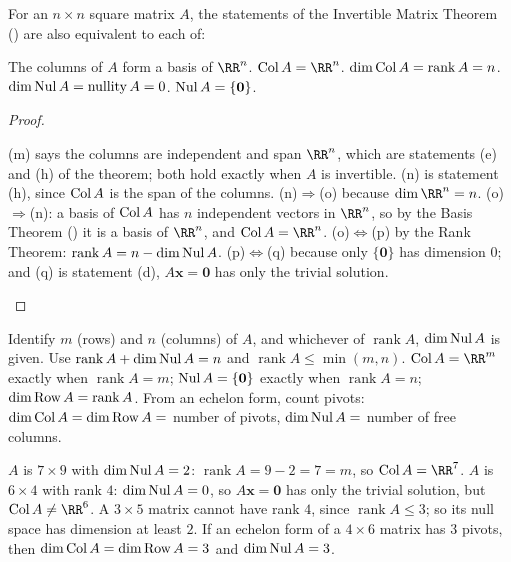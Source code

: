 \documentclass[10pt]{scrartcl}
\newcommand{\vv}[1]{\mathbf{#1}}
\begin{document}
\begin{theorem*}
  For an $n\times n$ square matrix $A$, the statements of the Invertible Matrix Theorem () are also equivalent to each of:
  \begin{enumerate}[(a),start=13]
    \ii The columns of $A$ form a basis of $\RR^n$.
    \ii $\Col A = \RR^n$.
    \ii $\dim\operatorname{Col} A = \operatorname{rank}A = n$.
    \ii $\dim\operatorname{Nul} A = \operatorname{nullity} A = 0$.
    \ii $\Nul A = \{\vv 0\}$.
  \end{enumerate}
\end{theorem*}
\begin{proof}
  \begin{steps}
    \ii (m) says the columns are independent and span $\RR^n$, which are statements (e) and (h) of the theorem; both hold exactly when $A$ is invertible.
    \ii (n) is statement (h), since $\operatorname{Col} A$ is the span of the columns.
    \ii (n)$\Rightarrow$(o) because $\dim\RR^n=n$. (o)$\Rightarrow$(n): a basis of $\operatorname{Col} A$ has $n$ independent vectors in $\RR^n$, so by the Basis Theorem () it is a basis of $\RR^n$, and $\Col A=\RR^n$.
    \ii (o)$\iff$(p) by the Rank Theorem: $\operatorname{rank}A=n-\dim\operatorname{Nul} A$.
    \ii (p)$\iff$(q) because only $\{\vv 0\}$ has dimension $0$; and (q) is statement (d), $A\vv x=\vv 0$ has only the trivial solution.
  \end{steps}
\end{proof}

\begin{steps}
  \ii Identify $m$ (rows) and $n$ (columns) of $A$, and whichever of $\operatorname{rank}A$, $\dim\operatorname{Nul} A$ is given.
  \ii Use $\operatorname{rank}A+\dim\operatorname{Nul} A=n$ and $\operatorname{rank}A\le\min(m,n)$.
  \ii $\Col A=\RR^m$ exactly when $\operatorname{rank}A=m$; $\Nul A=\{\vv 0\}$ exactly when $\operatorname{rank}A=n$; $\dim\operatorname{Row} A=\operatorname{rank}A$.
  \ii From an echelon form, count pivots: $\dim\operatorname{Col} A=\dim\operatorname{Row} A=$ number of pivots, $\dim\operatorname{Nul} A=$ number of free columns.
\end{steps}

\begin{example*}
\begin{itemize}
  \ii $A$ is $7\times9$ with $\dim\operatorname{Nul} A=2$: $\operatorname{rank}A=9-2=7=m$, so $\Col A=\RR^7$.
  \ii $A$ is $6\times4$ with rank $4$: $\dim\operatorname{Nul} A=0$, so $A\vv x=\vv 0$ has only the trivial solution, but $\Col A\ne\RR^6$.
  \ii A $3\times5$ matrix cannot have rank $4$, since $\operatorname{rank}A\le3$; so its null space has dimension at least $2$.
  \ii If an echelon form of a $4\times6$ matrix has $3$ pivots, then $\dim\operatorname{Col} A=\dim\operatorname{Row} A=3$ and $\dim\operatorname{Nul} A=3$.
\end{itemize}
\end{example*}
\end{document}
